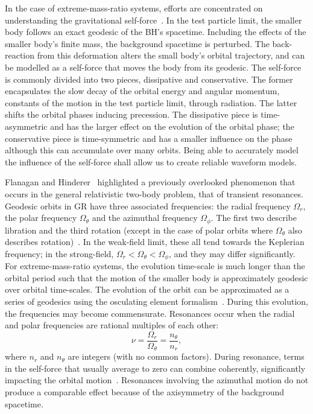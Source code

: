 \documentclass[aps,prd,amsfonts,amssymb,amsmath,nofootinbib,reprint,showpacs,superscriptaddress,twocolumn]{revtex4}
\begin{document}
In the case of extreme-mass-ratio systems, efforts are concentrated on understanding the gravitational self-force~\cite{Barack2009,Poisson2004}. In the test particle limit, the smaller body follows an exact geodesic of the BH's spacetime. Including the effects of the smaller body's finite mass, the background spacetime is perturbed. The back-reaction from this deformation alters the small body's orbital trajectory, and can be modelled as a self-force that moves the body from its geodesic. The self-force is commonly divided into two pieces, dissipative and conservative. The former encapsulates the slow decay of the orbital energy and angular momentum, constants of the motion in the test particle limit, through radiation. The latter shifts the orbital phases inducing precession. The dissipative piece is time-asymmetric and has the larger effect on the evolution of the orbital phase; the conservative piece is time-symmetric and has a smaller influence on the phase although this can accumulate over many orbits. Being able to accurately model the influence of the self-force shall allow us to create reliable waveform models.

Flanagan and Hinderer~\cite{Flanagan2012} highlighted a previously overlooked phenomenon that occurs in the general relativistic two-body problem, that of transient resonances. Geodesic orbits in GR have three associated frequencies: the radial frequency $\Omega_r$, the polar frequency $\Omega_\theta$ and the azimuthal frequency $\Omega_\phi$. The first two describe libration and the third rotation (except in the case of polar orbits where $\Omega_\theta$ also describes rotation)~\cite{Goldstein2002}. %
In the weak-field limit, these all tend towards the Keplerian frequency; in the strong-field, $\Omega_r < \Omega_\theta < \Omega_\phi$, and they may differ significantly. For extreme-mass-ratio systems, the evolution time-scale is much longer than the orbital period such that the motion of the smaller body is approximately geodesic over orbital time-scales. The evolution of the orbit can be approximated as a series of geodesics using the osculating element formalism~\cite{Pound2008,Gair2011a}. During this evolution, the frequencies may become commensurate. Resonances occur when the radial and polar frequencies are rational multiples of each other:
\begin{equation}
\nu = \frac{\Omega_r}{\Omega_\theta} = \frac{n_\theta}{n_r},
\end{equation}
where $n_r$ and $n_\theta$ are integers (with no common factors). During resonance, terms in the self-force that usually average to zero can combine coherently, significantly impacting the orbital motion~\cite{Flanagan2012a}. Resonances involving the azimuthal motion do not produce a comparable effect because of the axisymmetry of the background spacetime.
\end{document}
